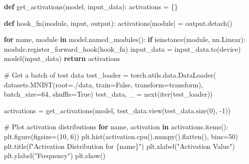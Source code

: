 \documentclass[
  letterpaper,
  DIV=11,
  numbers=noendperiod]{scrreprt}
\newenvironment{Shaded}{\begin{snugshade}}{\end{snugshade}}
\newcommand{\BuiltInTok}[1]{\textcolor[rgb]{0.00,0.23,0.31}{#1}}
\newcommand{\CommentTok}[1]{\textcolor[rgb]{0.37,0.37,0.37}{#1}}
\newcommand{\ControlFlowTok}[1]{\textcolor[rgb]{0.00,0.23,0.31}{\textbf{#1}}}
\newcommand{\DecValTok}[1]{\textcolor[rgb]{0.68,0.00,0.00}{#1}}
\newcommand{\KeywordTok}[1]{\textcolor[rgb]{0.00,0.23,0.31}{\textbf{#1}}}
\newcommand{\NormalTok}[1]{\textcolor[rgb]{0.00,0.23,0.31}{#1}}
\newcommand{\OperatorTok}[1]{\textcolor[rgb]{0.37,0.37,0.37}{#1}}
\newcommand{\SpecialCharTok}[1]{\textcolor[rgb]{0.37,0.37,0.37}{#1}}
\newcommand{\SpecialStringTok}[1]{\textcolor[rgb]{0.13,0.47,0.30}{#1}}
\newcommand{\StringTok}[1]{\textcolor[rgb]{0.13,0.47,0.30}{#1}}
\newcommand{\VariableTok}[1]{\textcolor[rgb]{0.07,0.07,0.07}{#1}}
\begin{document}
\begin{Shaded}
\begin{Highlighting}[]
\KeywordTok{def}\NormalTok{ get\_activations(model, input\_data):}
\NormalTok{    activations }\OperatorTok{=}\NormalTok{ \{\}}

    \KeywordTok{def}\NormalTok{ hook\_fn(module, }\BuiltInTok{input}\NormalTok{, output):}
\NormalTok{        activations[module] }\OperatorTok{=}\NormalTok{ output.detach()}

    \ControlFlowTok{for}\NormalTok{ name, module }\KeywordTok{in}\NormalTok{ model.named\_modules():}
        \ControlFlowTok{if} \BuiltInTok{isinstance}\NormalTok{(module, nn.Linear):}
\NormalTok{            module.register\_forward\_hook(hook\_fn)}
\NormalTok{    input\_data }\OperatorTok{=}\NormalTok{ input\_data.to(device)}
\NormalTok{    model(input\_data)}
    \ControlFlowTok{return}\NormalTok{ activations}

\CommentTok{\# Get a batch of test data}
\NormalTok{test\_loader }\OperatorTok{=}\NormalTok{ torch.utils.data.DataLoader(}
\NormalTok{    datasets.MNIST(root}\OperatorTok{=}\StringTok{\textquotesingle{}./data\textquotesingle{}}\NormalTok{, train}\OperatorTok{=}\VariableTok{False}\NormalTok{, transform}\OperatorTok{=}\NormalTok{transform),}
\NormalTok{    batch\_size}\OperatorTok{=}\DecValTok{64}\NormalTok{, shuffle}\OperatorTok{=}\VariableTok{True}\NormalTok{)}
\NormalTok{test\_data, \_ }\OperatorTok{=} \BuiltInTok{next}\NormalTok{(}\BuiltInTok{iter}\NormalTok{(test\_loader))}

\NormalTok{activations }\OperatorTok{=}\NormalTok{ get\_activations(model, test\_data.view(test\_data.size(}\DecValTok{0}\NormalTok{), }\OperatorTok{{-}}\DecValTok{1}\NormalTok{))}

\CommentTok{\# Plot activation distributions}
\ControlFlowTok{for}\NormalTok{ name, activation }\KeywordTok{in}\NormalTok{ activations.items():}
\NormalTok{    plt.figure(figsize}\OperatorTok{=}\NormalTok{(}\DecValTok{10}\NormalTok{, }\DecValTok{6}\NormalTok{))}
\NormalTok{    plt.hist(activation.cpu().numpy().flatten(), bins}\OperatorTok{=}\DecValTok{50}\NormalTok{)}
\NormalTok{    plt.title(}\SpecialStringTok{f"Activation Distribution for }\SpecialCharTok{\{}\NormalTok{name}\SpecialCharTok{\}}\SpecialStringTok{"}\NormalTok{)}
\NormalTok{    plt.xlabel(}\StringTok{"Activation Value"}\NormalTok{)}
\NormalTok{    plt.ylabel(}\StringTok{"Frequency"}\NormalTok{)}
\NormalTok{    plt.show()}
\end{Highlighting}
\end{Shaded}
\end{document}
